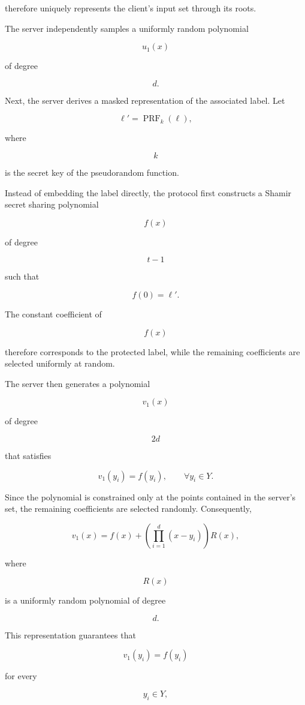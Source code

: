 \documentclass[11pt,a4paper]{article}
\begin{document}
therefore uniquely represents the client's input set through its roots.

The server independently samples a uniformly random polynomial

\[
u_1(x)
\]

of degree

\[
d.
\]

Next, the server derives a masked representation of the associated label. Let

\[
\ell'
=
\operatorname{PRF}_k(\ell),
\]

where

\[
k
\]

is the secret key of the pseudorandom function.

Instead of embedding the label directly, the protocol first constructs a Shamir secret sharing polynomial

\[
f(x)
\]

of degree

\[
t-1
\]

such that

\[
f(0)=\ell'.
\]

The constant coefficient of

\[
f(x)
\]

therefore corresponds to the protected label, while the remaining coefficients are selected uniformly at random.

The server then generates a polynomial

\[
v_1(x)
\]

of degree

\[
2d
\]

that satisfies

\[
v_1(y_i)
=
f(y_i),
\qquad
\forall
y_i\in Y.
\]

Since the polynomial is constrained only at the points contained in the server's set, the remaining coefficients are selected randomly. Consequently,

\[
v_1(x)
=
f(x)
+
\left(
\prod_{i=1}^{d}(x-y_i)
\right)
R(x),
\]

where

\[
R(x)
\]

is a uniformly random polynomial of degree

\[
d.
\]

This representation guarantees that

\[
v_1(y_i)=f(y_i)
\]

for every

\[
y_i\in Y,
\]
\end{document}
